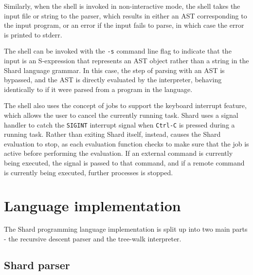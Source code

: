 \documentclass[twoside]{report}
\begin{document}
Similarly, when the shell is invoked in non-interactive mode, the shell takes the input file or string to the parser, which results in either an AST corresponding to the input program, or an error if the input fails to parse, in which case the error is printed to stderr.

The shell can be invoked with the \texttt{-s} command line flag to indicate that the input is an S-expression that represents an AST object rather than a string in the Shard language grammar. In this case, the step of parsing with an AST is bypassed, and the AST is directly evaluated by the interpreter, behaving identically to if it were parsed from a program in the language.

The shell also uses the concept of jobs to support the keyboard interrupt feature, which allows the user to cancel the currently running task.
Shard uses a signal handler to catch the \texttt{SIGINT} interrupt signal when \texttt{Ctrl-C} is pressed during a running task.
Rather than exiting Shard itself, instead, causes the Shard evaluation to stop, as each evaluation function checks to make sure that the job is active before performing the evaluation.
If an external command is currently being executed, the signal is passed to that command, and if a remote command is currently being executed, further processes is stopped.

\section{Language implementation}


The Shard programming language implementation is split up into two main parts - the recursive descent parser and the tree-walk interpreter.

\subsection{Shard parser}
\end{document}
